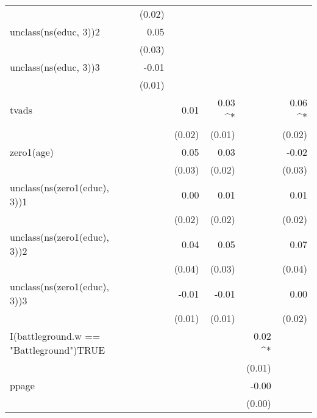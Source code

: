 \documentclass[doc,fignum,noapacite]{apa}
\begin{document}
\begin{table}[!ht]
\begin{tabular}{ l D{.}{.}{2}D{.}{.}{2}D{.}{.}{2}D{.}{.}{2}D{.}{.}{2} }
                                        & (0.02)   &          &          &          &         \\ 
unclass(ns(educ, 3))2                   & 0.05     &          &          &          &         \\ 
                                        & (0.03)   &          &          &          &         \\ 
unclass(ns(educ, 3))3                   & -0.01    &          &          &          &         \\ 
                                        & (0.01)   &          &          &          &         \\ 
tvads                                   &          & 0.01     & 0.03 ^*  &          & 0.06 ^* \\ 
                                        &          & (0.02)   & (0.01)   &          & (0.02)  \\ 
zero1(age)                              &          & 0.05     & 0.03     &          & -0.02   \\ 
                                        &          & (0.03)   & (0.02)   &          & (0.03)  \\ 
unclass(ns(zero1(educ), 3))1            &          & 0.00     & 0.01     &          & 0.01    \\ 
                                        &          & (0.02)   & (0.02)   &          & (0.02)  \\ 
unclass(ns(zero1(educ), 3))2            &          & 0.04     & 0.05     &          & 0.07    \\ 
                                        &          & (0.04)   & (0.03)   &          & (0.04)  \\ 
unclass(ns(zero1(educ), 3))3            &          & -0.01    & -0.01    &          & 0.00    \\ 
                                        &          & (0.01)   & (0.01)   &          & (0.02)  \\ 
I(battleground.w == "Battleground")TRUE &          &          &          & 0.02 ^*  &         \\ 
                                        &          &          &          & (0.01)   &         \\ 
ppage                                   &          &          &          & -0.00    &         \\ 
                                        &          &          &          & (0.00)   &         \\ 

\end{tabular}
\end{table}
\end{document}
